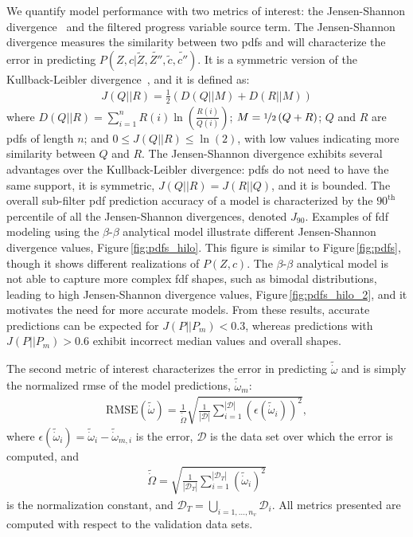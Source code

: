 \documentclass[review]{elsarticle}
\newcommand{\wt}[1]{\widetilde{#1}}
\begin{document}
We quantify model performance with two metrics of interest: the
Jensen-Shannon divergence~\cite{Endres2003, Osterreicher2003} and the
filtered progress variable source term. The Jensen-Shannon divergence
measures the similarity between two \glspl{pdf} and will characterize
the error in predicting $P(Z,c | \wt{Z}, \wt{Z''}, \wt{c},
\wt{c''})$. It is a symmetric version of the Kullback-Leibler
divergence~\cite{Kullback1987}, and it is defined as:
\begin{align}
  \label{eq:jsd}
  J(Q||R) = \frac{1}{2} \left( D(Q || M) + D(R || M)\right)
\end{align}
where
$D(Q||R) = \sum_{i=1}^n R(i) \ln{\left( \frac{R(i)}{Q(i)} \right)}$;
$M = \nicefrac{1}{2} \left( Q+R \right)$; $Q$ and $R$ are \glspl{pdf}
of length $n$; and $0\leq J(Q||R) \leq \ln{(2)}$, with low values
indicating more similarity between $Q$ and $R$. The Jensen-Shannon
divergence exhibits several advantages over the Kullback-Leibler
divergence: \glspl{pdf} do not need to have the same support, it is
symmetric, $J(Q||R) = J(R||Q)$, and it is bounded. The overall
sub-filter \gls{pdf} prediction accuracy of a model is characterized
by the $90^{\text{th}}$ percentile of all the Jensen-Shannon
divergences, denoted $J_{90}$. Examples of \gls{fdf}
modeling using the $\beta$-$\beta$ analytical model illustrate
different Jensen-Shannon divergence values,
Figure\,\ref{fig:pdfs_hilo}. This figure is similar to
Figure\,\ref{fig:pdfs}, though it shows different realizations of
$P(Z,c)$. The $\beta$-$\beta$ analytical model is not able to capture
more complex \gls{fdf} shapes, such as bimodal
distributions, leading to high Jensen-Shannon divergence values,
Figure\,\ref{fig:pdfs_hilo_2}, and it motivates the need for more
accurate models.  From these results, accurate predictions can be
expected for $J(P||P_m) < 0.3$, whereas predictions with
$J(P||P_m) > 0.6$ exhibit incorrect median values and overall shapes.

The second metric of interest characterizes the error in predicting
$\wt{\dot{\omega}}$ and is simply the normalized \gls{rmse} of the model predictions, $\wt{\dot{\omega}}_m$:
\begin{align}
  \label{eq:rmse}
  \text{RMSE}(\wt{\dot{\omega}}) = \frac{1}{\wt{\dot{\Omega}}}\sqrt{ \frac{1}{|\mathcal{D}|}\sum_{i=1}^{|\mathcal{D}|}\left( \epsilon(\wt{\dot{\omega}}_i) \right)^2},
\end{align}
where
$\epsilon(\wt{\dot{\omega}}_i) = \wt{\dot{\omega}}_i -
\wt{\dot{\omega}}_{m,i}$ is the error, $\mathcal{D}$ is the data set
over which the error is computed, and
\begin{align}
  \label{eq:norm}
  \wt{\dot{\Omega}} = \sqrt{\frac{1}{|\mathcal{D}_T|} \sum_{i=1}^{|\mathcal{D}_T|} \left( \wt{\dot{\omega}}_i \right)^2}
\end{align}
is the normalization constant, and
$\mathcal{D}_T = \bigcup\limits_{i=1, \dots, n_v} \mathcal{D}_i$. All metrics
presented are computed with respect to the validation data sets.
\end{document}
